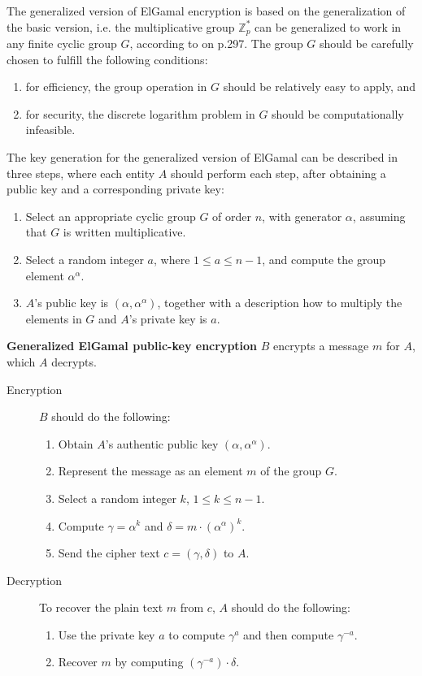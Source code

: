 \documentclass{acm_proc_article-sp}
\begin{document}
    The generalized version of ElGamal encryption is based on the generalization of the basic version, i.e. the multiplicative group $\mathbb{Z}^*_p$ can be generalized to work in any finite cyclic group $G$, according to \cite{handcrypt} on p.297. The group $G$ should be carefully chosen to fulfill the following conditions:
    \begin{enumerate}
        \item for efficiency, the group operation in $G$ should be relatively easy to apply, and
        \item for security, the discrete logarithm problem in $G$ should be computationally infeasible.
    \end{enumerate}
    The key generation for the generalized version of ElGamal can be described in three steps, where each entity $A$ should perform each step, after obtaining a public key and a corresponding private key:
    \begin{enumerate} %
        \item Select an appropriate cyclic group $G$ of order $n$, with generator $\alpha$, assuming that $G$ is written multiplicative. 
        \item Select a random integer $a$, where $1 \leq a \leq n - 1$, and compute the group element $\alpha^\alpha$.
        \item $A$'s public key is $(\alpha, \alpha^\alpha)$, together with a description how to multiply the elements in $G$ and $A$'s private key is $a$.
    \end{enumerate}
    \textbf{Generalized ElGamal public-key encryption}
    $B$ encrypts a message $m$ for $A$, which $A$ decrypts.
    \begin{description} 
        \item[Encryption] $B$ should do the following:
        \begin{enumerate}
            \item Obtain $A$'s authentic public key $(\alpha, \alpha^\alpha)$.
            \item Represent the message as an element $m$ of the group $G$.
            \item Select a random integer $k$, $1 \leq k \leq n - 1$.
            \item Compute $\gamma = \alpha^k$ and $\delta = m \cdot (\alpha^\alpha)^k$.
            \item Send the cipher text $c = (\gamma, \delta)$ to $A$.
        \end{enumerate}
        \item[Decryption] To recover the plain text $m$ from $c$, $A$ should do the following: 
        \begin{enumerate}
            \item Use the private key $a$ to compute $\gamma^a$ and then compute $\gamma^{-a}$.
            \item Recover $m$ by computing $(\gamma^{-a}) \cdot \delta$.
        \end{enumerate}
    \end{description}
\end{document}
